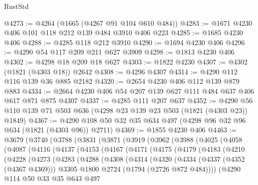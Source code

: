 \begin{lexlean}{RustStd}
\begin{coremodule}
{\begin{coremodule}
{{{{{{{{{{{{{{@4273 := @4264 (@1665 (@4267 @91 @104 @610 @484))
@4283 := @1671 @4230 @406 @101 @118 @212 @139 @484 @3910 @406 @223
@4285 := @1685 @4230 @406
@4288 := @4285 @118 @212 @3910
@4290 := @1694 @4230 @406
@4296 := @4290 @54 @117 @209 @211 @627 @3909
@4298 := @1813 @4230 @406
@4302 := @4298 @18 @209 @18 @627
@4303 := @1822 @4230
@4307 := @4302 (@1821 (@4303 @18)) @2642
@4308 := @4296 @4307
@4314 := @4290 @112 @116 @139 @36 @885 @2182
@4320 := @2654 @4230 @406 @112 @139 @879 @883
@4334 := @2664 @4230 @406 @54 @207 @139 @627 @111 @484 @637 @406 @617 @871 @875 @4307
@4337 := @4285 @111 @207 @637
@4352 := @4290 @56 @110 @139 @71 @503 @636 (@4298 @23 @139 @23 @503 (@1821 (@4303 @23)) @1849)
@4367 := @4290 @108 @50 @32 @35 @634 @497 (@4298 @96 @32 @96 @634 (@1821 (@4303 @96)) @2711)
@4369 := @1855 @4230 @406
@4463 := @3679
    (@3740
      (@3788
        (@3831
          (@3871
            (@3919
              (@3962
                (@3988
                  (@4025
                    (@4058
                      (@4087
                        (@4116
                          (@4137
                            (@4153
                              (@4167
                                (@4171
                                  (@4175
                                    (@4179
                                      (@4183
                                        (@4210
                                          (@4228
                                            (@4273
                                              (@4283
                                                (@4288
                                                  (@4308
                                                    (@4314
                                                      (@4320
                                                        (@4334
                                                          (@4337 (@4352 (@4367 @4369)))
                                                          @3305
                                                          @1800
                                                          @2724
                                                          (@1794 (@2726 @872 @484))))
                                                      (@4290
                                                        @114
                                                        @50
                                                        @33
                                                        @35
                                                        @643
                                                        @497
}}}}}}}}}}}}}}
\end{coremodule}}
\end{coremodule}
\end{lexlean}
